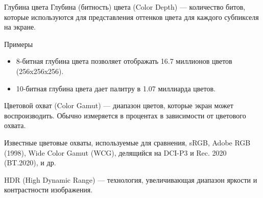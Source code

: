 \documentclass{beamer}
\begin{document}
	\begin{frame}{Глубина цвета}
		Глубина (битность) цвета (Color Depth) --- количество битов, которые используются для представления оттенков цвета для каждого субпикселя на экране.

		{\footnotesize
		Примеры
		\begin{itemize}
			\item 
			8-битная глубина цвета позволяет отображать 16.7 миллионов цветов (256x256x256).
			\item 
			10-битная глубина цвета дает палитру в 1.07 миллиарда цветов.
		\end{itemize}
		}

		Цветовой охват (Color Gamut) --- диапазон цветов, которые экран может воспроизводить.
		Обычно измеряется в процентах в зависимости от цветового охвата.

		{\footnotesize
		Известные цветовые охваты, используемые для сравнения, sRGB, Adobe RGB (1998), Wide Color Gamut (WCG), делящийся на DCI-P3 и Rec. 2020 (BT.2020), и др.
		}

		HDR (High Dynamic Range) --- технология, увеличивающая диапазон яркости и контрастности изображения. 

		
		
	
	\end{frame}
\end{document}
